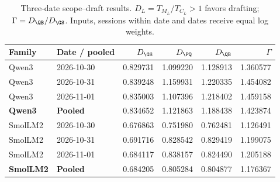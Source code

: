 \begin{table}[t]\centering\small
\caption{Three-date scope--draft results. $D_L=T_{M_L}/T_{C_L}>1$ favors drafting; $\Gamma=D_{\QB}/D_{\GS}$. Inputs, sessions within date and dates receive equal log weights.}\label{tab:scopefinal}
\begin{tabular}{@{}llrrrr@{}}\toprule
Family & Date / pooled & $D_{\GS}$ & $D_{\PQ}$ & $D_{\QB}$ & $\Gamma$\\\midrule
Qwen3 & 2026-10-30 & 0.829731 & 1.099220 & 1.128913 & 1.360577\\
Qwen3 & 2026-10-31 & 0.839248 & 1.159931 & 1.220335 & 1.454082\\
Qwen3 & 2026-11-01 & 0.835003 & 1.107396 & 1.218402 & 1.459158\\
\textbf{Qwen3} & \textbf{Pooled} & 0.834652 & 1.121863 & 1.188438 & 1.423874\\\midrule
SmolLM2 & 2026-10-30 & 0.676863 & 0.751980 & 0.762481 & 1.126491\\
SmolLM2 & 2026-10-31 & 0.691716 & 0.828542 & 0.829419 & 1.199075\\
SmolLM2 & 2026-11-01 & 0.684117 & 0.838157 & 0.824490 & 1.205188\\
\textbf{SmolLM2} & \textbf{Pooled} & 0.684205 & 0.805284 & 0.804877 & 1.176367\\\bottomrule
\end{tabular}
\end{table}
